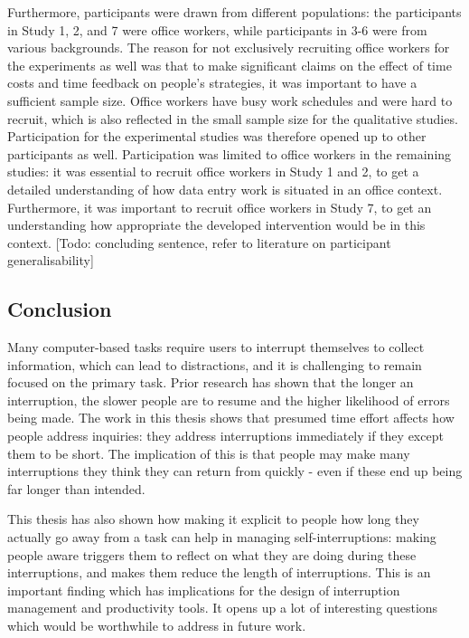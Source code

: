 Furthermore, participants were drawn from different populations: the participants in Study 1, 2, and 7 were office workers, while participants in 3-6 were from various backgrounds. The reason for not exclusively recruiting office workers for the experiments as well was that to make significant claims on the effect of time costs and time feedback on people’s strategies, it was important to have a sufficient sample size. Office workers have busy work schedules and were hard to recruit, which is also reflected in the small sample size for the qualitative studies. Participation for the experimental studies was therefore opened up to other participants as well. Participation was limited to office workers in the remaining studies: it was essential to recruit office workers in Study 1 and 2, to get a detailed understanding of how data entry work is situated in an office context. Furthermore, it was important to recruit office workers in Study 7, to get an understanding how appropriate the developed intervention would be in this context. [Todo: concluding sentence,  refer to literature on participant generalisability]


\subsection{Conclusion}
Many computer-based tasks require users to interrupt themselves to collect information, which can lead to distractions, and it is challenging to remain focused on the primary task. Prior research has shown that the longer an interruption, the slower people are to resume and the higher likelihood of errors being made. The work in this thesis shows that presumed time effort affects how people address inquiries: they address interruptions immediately if they except them to be short. The implication of this is that people may make many interruptions they think they can return from quickly - even if these end up being far longer than intended.

This thesis has also shown how making it explicit to people how long they actually go away from a task can help in managing self-interruptions: making people aware triggers them to reflect on what they are doing during these interruptions, and makes them reduce the length of interruptions. This is an important finding which has implications for the design of interruption management and productivity tools. It opens up a lot of interesting questions which would be worthwhile to address in future work. 

